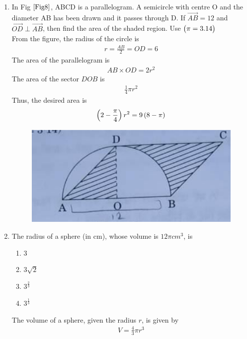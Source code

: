 \documentclass[journal,12pt,twocolumn]{IEEEtran}
\begin{document}
\begin{enumerate}
    \item In Fig $\ref{Fig8}$, ABCD is a parallelogram. A semicircle with centre O and the diameter AB has been drawn and it passes through D. If $\Vec{AB} = 12$ and $\Vec{OD} \perp \Vec{AB}$, then find the area of the shaded region. Use $\begin{pmatrix}\pi = 3.14\end{pmatrix}$\\
	    \solution From the figure, the radius of the circle is  
	    \begin{align}
		    r = \frac{AB}{2} = OD = 6
	    \end{align}
	    The area of the parallelogram is 
	    \begin{align}
		    AB \times OD = 2r^2 
	    \end{align}
	    The area of the sector $DOB$ is 
	    \begin{align}
		    \frac{1}{4}\pi r^2 
	    \end{align}
	    Thus, the desired area is 
	    \begin{align}
		    \left(2 -  \frac{\pi}{4}\right) r^2 = 9\left(8 - \pi\right)
	    \end{align}
    \begin{figure}[h!]
        \centering
        \includegraphics[width=0.5\columnwidth]{Fig8.png}
    	\caption{}
    	\label{Fig8}
     \end{figure} 

\item The radius of a sphere (in cm), whose volume is $12\pi cm^3$, is
\begin{enumerate}
    \item $3$
    \item $3 \sqrt{2}$
    \item $3^\frac{2}{3}$
    \item $3^\frac{1}{3}$
\end{enumerate}
\solution 
The volume of a sphere, given the radius $r$, is given by
\begin{align}
	V = \frac{4}{3}\pi r^3
\end{align}


\end{enumerate}
\end{document}
